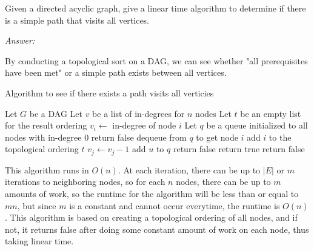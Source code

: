 \documentclass[12pt]{article}
\newenvironment{problem}[2][Problem]{\begin{trivlist}
\item[\hskip \labelsep {\bfseries #1}\hskip \labelsep {\bfseries #2.}]}{\end{trivlist}}
\begin{document}
\begin{problem}{6}
Given a directed acyclic graph, give a linear time algorithm to determine if there is a simple path that visits all vertices.
\end{problem}
\textit{Answer: } 

By conducting a topological sort on a DAG, we can see whether "all prerequisites have been met" or a simple path exists between all vertices.

\begin{algorithm}
\caption{Algorithm to see if there exists a path visits all verticies}
\begin{algorithmic}
\State Let $G$ be a DAG
\State Let $v$ be a list of in-degrees for $n$ nodes
\State Let $t$ be an empty list for the result ordering
	\State $v_i \gets$ in-degree of node $i$
\EndFor
\State Let $q$ be a queue initialized to all nodes with in-degree 0
		\State return false
	\EndIf
	\State dequeue from $q$ to get node $i$
	\State add $i$ to the topological ordering $t$
		\State $v_j \gets v_j-1$
			\State add $u$ to $q$
			\State return false
		\EndIf
	\EndFor
\EndWhile
{}
	\State return true
\Else
	\State return false
\EndIf
\end{algorithmic}
\end{algorithm}

This algorithm runs in $O(n)$. At each iteration, there can be up to $|E|$ or $m$ iterations to neighboring nodes, so for each $n$ nodes, there can be up to $m$ amounts of work, so the runtime for the algorithm will be less than or equal to $mn$, but since $m$ is a constant and cannot occur everytime, the runtime is $O(n)$. This algorithm is based on creating a topological ordering of all nodes, and if not, it returns false after doing some constant amount of work on each node, thus taking linear time. 
\end{document}
